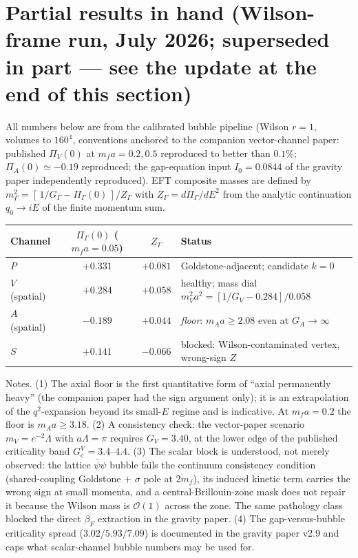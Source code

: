 \documentclass[11pt,a4paper]{article}
\begin{document}
\section{Partial results in hand (Wilson-frame run, July 2026;
superseded in part --- see the update at the end of this section)}
\label{sec:partial}

All numbers below are from the calibrated bubble pipeline
(Wilson $r=1$, volumes to $160^4$, conventions anchored to the
companion vector-channel paper: published $\Pi_V(0)$ at
$m_f a = 0.2, 0.5$ reproduced to better than $0.1\%$;
$\Pi_A(0) \simeq -0.19$ reproduced; the gap-equation input
$I_0 = 0.0844$ of the gravity paper independently reproduced).
EFT composite masses are defined by
$m_\Gamma^2 = [\,1/G_\Gamma - \Pi_\Gamma(0)\,]/Z_\Gamma$ with
$Z_\Gamma = d\Pi_\Gamma/dE^2$ from the analytic continuation
$q_0 \to iE$ of the finite momentum sum.

\begin{center}
\begin{tabular}{lccl}
\toprule
Channel & $\Pi_\Gamma(0)$ ($m_f a{=}0.05$) & $Z_\Gamma$ & Status \\
\midrule
$P$ & $+0.331$ & $+0.081$ & Goldstone-adjacent; candidate $k{=}0$ \\
$V$ (spatial) & $+0.284$ & $+0.058$ & healthy; mass dial
  $m_V^2 a^2 = [1/G_V - 0.284]/0.058$ \\
$A$ (spatial) & $-0.189$ & $+0.044$ & \emph{floor}:
  $m_A a \ge 2.08$ even at $G_A \to \infty$ \\
$S$ & $+0.141$ & $-0.066$ & blocked: Wilson-contaminated vertex,
  wrong-sign $Z$ \\
\bottomrule
\end{tabular}
\end{center}

Notes.
(1) The axial floor is the first quantitative form of ``axial
permanently heavy'' (the companion paper had the sign argument
only); it is an extrapolation of the $q^2$-expansion beyond its
small-$E$ regime and is indicative.
At $m_f a = 0.2$ the floor is $m_A a \ge 3.18$.
(2) A consistency check: the vector-paper scenario
$m_V = e^{-2}\Lambda$ with $a\Lambda = \pi$ requires
$G_V = 3.40$, at the lower edge of the published criticality band
$G_c^V = 3.4$--$4.4$.
(3) The scalar block is understood, not merely observed: the
lattice $\bar\psi\psi$ bubble fails the continuum consistency
condition (shared-coupling Goldstone $+$ $\sigma$ pole at $2m_f$),
its induced kinetic term carries the wrong sign at small momenta,
and a central-Brillouin-zone mask does not repair it because the
Wilson mass is $\mathcal{O}(1)$ across the zone.
The same pathology class blocked the direct $\beta_F$ extraction
in the gravity paper.
(4) The gap-versus-bubble criticality spread
($3.02 / 5.93 / 7.09$) is documented in the gravity paper v2.9
and caps what scalar-channel bubble numbers may be used for.
\end{document}
